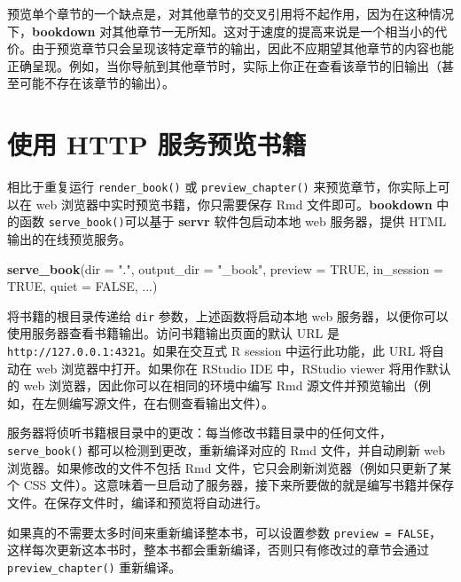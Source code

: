 \documentclass[
  12pt,
]{krantz}
\newenvironment{Shaded}{\begin{snugshade}}{\end{snugshade}}
\newcommand{\AttributeTok}[1]{\textcolor[rgb]{0.13,0.29,0.53}{#1}}
\newcommand{\ConstantTok}[1]{\textcolor[rgb]{0.56,0.35,0.01}{#1}}
\newcommand{\FunctionTok}[1]{\textcolor[rgb]{0.13,0.29,0.53}{\textbf{#1}}}
\newcommand{\NormalTok}[1]{#1}
\newcommand{\StringTok}[1]{\textcolor[rgb]{0.31,0.60,0.02}{#1}}
\theoremstyle{definition}
\theoremstyle{definition}
\theoremstyle{definition}
\theoremstyle{definition}
\theoremstyle{remark}
\begin{document}
预览单个章节的一个缺点是，对其他章节的交叉引用将不起作用，因为在这种情况下，\textbf{bookdown} 对其他章节一无所知。这对于速度的提高来说是一个相当小的代价。由于预览章节只会呈现该特定章节的输出，因此不应期望其他章节的内容也能正确呈现。例如，当你导航到其他章节时，实际上你正在查看该章节的旧输出（甚至可能不存在该章节的输出）。

\hypertarget{ux4f7fux7528-http-ux670dux52a1ux9884ux89c8ux4e66ux7c4d}{%
\section{使用 HTTP 服务预览书籍}\label{ux4f7fux7528-http-ux670dux52a1ux9884ux89c8ux4e66ux7c4d}}

相比于重复运行 \texttt{render\_book()} 或 \texttt{preview\_chapter()} 来预览章节，你实际上可以在 web 浏览器中实时预览书籍，你只需要保存 Rmd 文件即可。\textbf{bookdown} 中的函数 \texttt{serve\_book()}可以基于 \textbf{servr} 软件包\citep{R-servr}启动本地 web 服务器，提供 HTML 输出的在线预览服务。

\begin{Shaded}
\begin{Highlighting}[]
\FunctionTok{serve\_book}\NormalTok{(}\AttributeTok{dir =} \StringTok{"."}\NormalTok{, }\AttributeTok{output\_dir =} \StringTok{"\_book"}\NormalTok{,}
  \AttributeTok{preview =} \ConstantTok{TRUE}\NormalTok{, }\AttributeTok{in\_session =} \ConstantTok{TRUE}\NormalTok{, }\AttributeTok{quiet =} \ConstantTok{FALSE}\NormalTok{,}
\NormalTok{  ...)}
\end{Highlighting}
\end{Shaded}

将书籍的根目录传递给 \texttt{dir} 参数，上述函数将启动本地 web 服务器，以便你可以使用服务器查看书籍输出。访问书籍输出页面的默认 URL 是 \texttt{http://127.0.0.1:4321}。如果在交互式 R session 中运行此功能，此 URL 将自动在 web 浏览器中打开。如果你在 RStudio IDE 中，RStudio viewer 将用作默认的 web 浏览器，因此你可以在相同的环境中编写 Rmd 源文件并预览输出（例如，在左侧编写源文件，在右侧查看输出文件）。

服务器将侦听书籍根目录中的更改：每当修改书籍目录中的任何文件，\texttt{serve\_book()} 都可以检测到更改，重新编译对应的 Rmd 文件，并自动刷新 web 浏览器。如果修改的文件不包括 Rmd 文件，它只会刷新浏览器（例如只更新了某个 CSS 文件）。这意味着一旦启动了服务器，接下来所要做的就是编写书籍并保存文件。在保存文件时，编译和预览将自动进行。

如果真的不需要太多时间来重新编译整本书，可以设置参数 \texttt{preview\ =\ FALSE}，这样每次更新这本书时，整本书都会重新编译，否则只有修改过的章节会通过 \texttt{preview\_chapter()} 重新编译。
\end{document}

